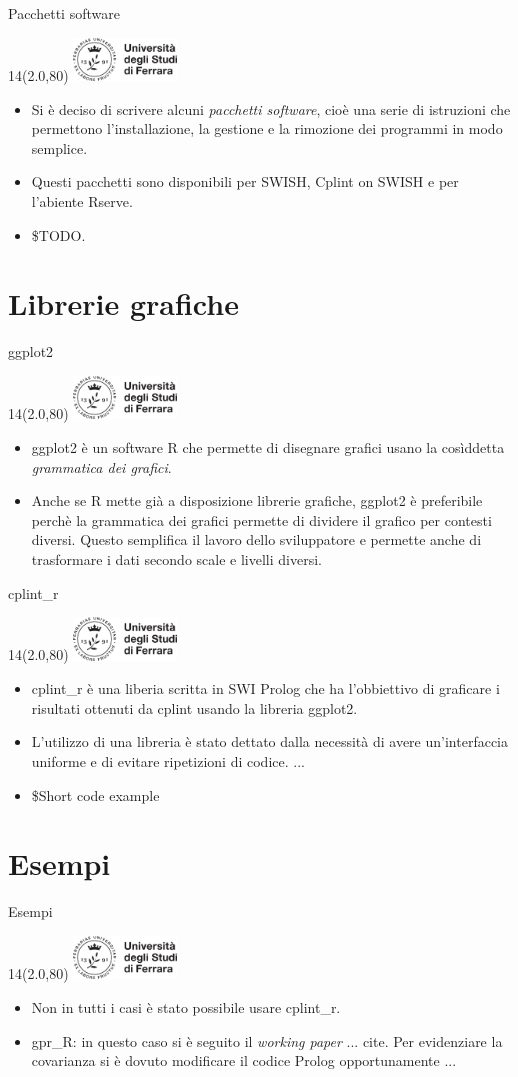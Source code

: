 \documentclass[11pt,xcolor={dvipsnames},default]{beamer} %
\newcommand{\MyLogo}{%
\begin{textblock}{14}(2.0,80)
 \includegraphics[height=1.15cm, angle=0]{logo}
\end{textblock}
}
\begin{document}
\begin{frame}{Pacchetti software}
\transboxin
\MyLogo
\begin{itemize}
\item Si è deciso di scrivere alcuni \emph{pacchetti software}, cioè una serie 
di istruzioni che permettono l'installazione, la gestione e la rimozione dei 
programmi in modo semplice.
\item Questi pacchetti sono disponibili per SWISH, Cplint on SWISH e per 
l'abiente Rserve.
\item \$TODO.
\end{itemize}
\end{frame}

\section{Librerie grafiche}
\begin{frame}{ggplot2}
\transboxin
\MyLogo
\begin{itemize}
\item ggplot2 è un software R che permette di disegnare grafici usano la 
cosìddetta \emph{grammatica dei grafici}.
\item Anche se R mette già a disposizione librerie grafiche, ggplot2 è 
preferibile perchè la grammatica dei grafici permette di dividere il grafico 
per contesti diversi. Questo semplifica il lavoro dello sviluppatore e permette 
anche di trasformare i dati secondo scale e livelli diversi.
\end{itemize}
\end{frame}

\begin{frame}{cplint\_r}
\transboxin
\MyLogo
\begin{itemize}
\item cplint\_r è una liberia scritta in SWI Prolog che ha l'obbiettivo di 
graficare i risultati ottenuti da cplint usando la libreria ggplot2.
\item L'utilizzo di una libreria è stato dettato dalla necessità di avere 
un'interfaccia uniforme e di evitare ripetizioni di codice. ...
\item \$Short code example
\end{itemize}
\end{frame}

\section{Esempi}
\begin{frame}{Esempi}
\transboxin
\MyLogo
\begin{itemize}
\item Non in tutti i casi è stato possibile usare cplint\_r.
\item gpr\_R: in questo caso si è seguito il \emph{working paper} ... cite. Per 
evidenziare la covarianza si è dovuto modificare il codice Prolog 
opportunamente ...
\end{itemize}
\end{frame}
\end{document}
